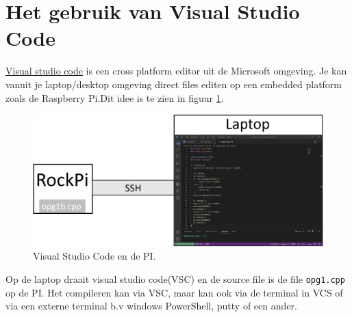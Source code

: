 \section{Het gebruik van Visual Studio Code} \label{app:vsc}
\label{sec:vsc}
\href{https://code.visualstudio.com/docs}{Visual studio code} is een cross platform editor uit de Microsoft omgeving. Je kan vanuit je laptop/desktop omgeving direct files editen op een embedded platform zoals de Raspberry Pi.Dit idee is te zien in figuur \ref{fig:winVCS}.
	\begin{figure}[h!]
	\captionsetup{justification=centering}
	\includegraphics[width=0.65 \linewidth]{figuren/laptopVCS}
	\centering
	\caption{Visual Studio Code en de PI.}
	\label{fig:winVCS}
\end{figure}
Op de laptop draait visual studio code(VSC) en de source file is de file \texttt{opg1.cpp} op de PI. Het compileren kan via VSC, maar kan ook via de terminal in VCS of via een externe terminal b.v windows PowerShell, putty of een ander.
 

